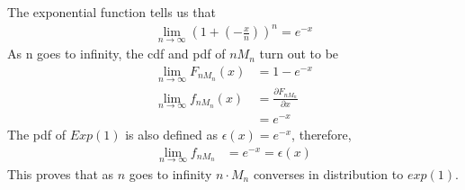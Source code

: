 \documentclass[12pt,letterpaper]{article}
\begin{document}
\noindent The exponential function tells us that 
\begin{align*}
\lim_{n\to\infty}(1 + (-\frac{x}{n}))^n = e^{-x}
\end{align*}
\noindent As n goes to infinity, the cdf and pdf of $nM_n$ turn out to be
\begin{align*}
\lim_{n\to\infty} F_{nM_n}(x) &= 1 - e^{-x} \\
\lim_{n\to\infty} f_{nM_n}(x) &= \frac{\partial F_{nM_n}}{\partial x} \\
&= e^{-x}
\end{align*}
\noindent The pdf of $Exp(1)$ is also defined as $\epsilon (x) = e^{-x}$, therefore, 
\begin{align*}
\lim_{n\to\infty} f_{nM_n} &= e^{-x} = \epsilon (x)
\end{align*}
\noindent This proves that as $n$ goes to infinity $n \cdot M_{n}$ converses in distribution to $exp(1)$.


\end{document}
